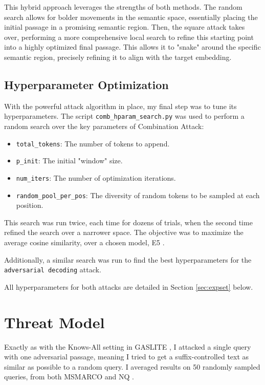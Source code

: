 \documentclass[a4paper, sigconf]{acmart}
\begin{document}
This hybrid approach leverages the strengths of both methods. The random search allows for bolder movements in the semantic space, essentially placing the initial passage in a promising semantic region. Then, the square attack takes over, performing a more comprehensive local search to refine this starting point into a highly optimized final passage. This allows it to "snake" around the specific semantic region, precisely refining it to align with the target embedding.


\subsection{Hyperparameter Optimization}

With the powerful attack algorithm in place, my final step was to tune its hyperparameters. The script \texttt{comb\_hparam\_search.py} was used to perform a random search over the key parameters of Combination Attack:

\begin{itemize}
  \item \texttt{total\_tokens}: The number of tokens to append.
  \item \texttt{p\_init}: The initial "window" size.
  \item \texttt{num\_iters}: The number of optimization iterations.
  \item \texttt{random\_pool\_per\_pos}: The diversity of random tokens to be sampled at each position.
\end{itemize}

This search was run twice, each time for dozens of trials, when the second time refined the search over a narrower space. The objective was to maximize the average cosine similarity, over a chosen model, E5 \cite{wang2024}.

Additionally, a similar search was run to find the best hyperparameters for the \texttt{adversarial decoding} attack.

All hyperparameters for both attacks are detailed in Section \ref{sec:expset} below.  


\section{Threat Model} 

Exactly as with the Knows-All setting in GASLITE \cite{bentov2024}, I attacked a single query with one adversarial passage, meaning I tried to get a suffix-controlled text as similar as possible to a random query. I averaged results on 50 randomly sampled queries, from both MSMARCO \cite{bajaj2018} and NQ \cite{kwiatkowski2019}. 
\end{document}
